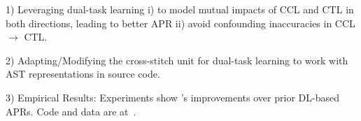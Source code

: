 

1) Leveraging dual-task learning i) to model mutual impacts of CCL and
CTL in both directions, leading to better APR ii) avoid confounding
inaccuracies in CCL $\rightarrow$ CTL.

2) Adapting/Modifying the cross-stitch unit for dual-task
learning to work with AST representations in source code.







3) Empirical Results: 
Experiments show {\tool}'s improvements over prior
DL-based APRs. Code and data are at~\cite{CDFix2022}.




